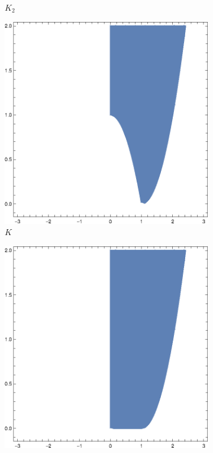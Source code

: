 \begin{figure}
\begin{subfigure}[b]{0.19\textwidth}
         \caption{$K_2$}
        \label{fig.pwl.K2}
 \end{subfigure}
  \hfill
  \begin{subfigure}[b]{0.19\textwidth}
         \centering
         \includegraphics[width=\textwidth]{Chapter2/media/K.eps}
         \caption{$K$}
        \label{fig.pwl.K}
 \end{subfigure}
  \hfill
  \begin{subfigure}[b]{0.19\textwidth}
         \centering
         \includegraphics[width=\textwidth]{Chapter2/media/Khull.eps}

\end{subfigure}
\end{figure}
